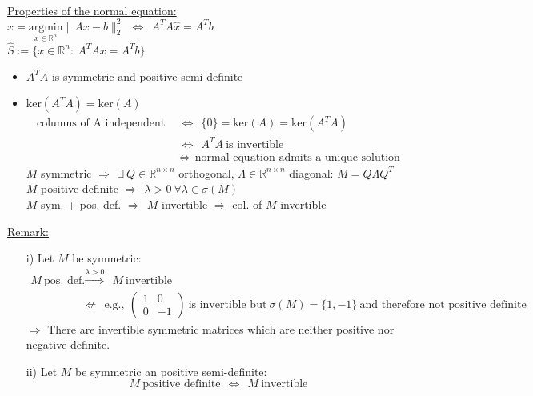 \begin{frame}
	~\\
	{\blank
	\underline{Properties of the normal equation:}\\
	$\widehat{x}=\underset{x\in\mathbb{R}^n}{\mathrm{argmin}}\|Ax-b\|_2^2~~\Leftrightarrow~~A^TA\widehat{x}=A^Tb$\\
	$\widehat{S}:=\{x\in\mathbb{R}^n:~A^TAx=A^Tb\}$
	\begin{itemize}\blank
		\item 
		$A^TA$ is symmetric and positive semi-definite
		\item
		$\text{ker}(A^TA)=\text{ker}(A)$
		\begin{align*}
		\text{columns of A independent}~~&\Leftrightarrow~~\{0\}=\text{ker}(A)=\text{ker}(A^TA)\\
		&\Leftrightarrow~~A^TA~\text{is invertible}\\
		&\Leftrightarrow~~\text{normal equation admits a unique solution}
		\end{align*}
		$M$ symmetric $\Rightarrow~~\exists~Q\in\mathbb{R}^{n\times n}$ orthogonal, $\Lambda\in\mathbb{R}^{n\times n}$ diagonal: $M=Q\Lambda Q^T$\\
		$M$ positive definite $\Rightarrow~~\lambda >0~\forall\lambda\in\sigma(M)$\\
		$M$ sym. + pos. def. $\Rightarrow~~M$ invertible $\Rightarrow$ col. of $M$ invertible
	\end{itemize}
\underline{Remark:}
\begin{itemize}\blank
	\item [i)]
	Let $M$ be symmetric:
	\begin{align*}
	M~\text{pos. def.}~~&\stackrel{\lambda>0}{\Rightarrow}~~M~\text{invertible}\\
	&\nLeftarrow~~\text{e.g.},~\begin{pmatrix}1&0\\0&-1\end{pmatrix}~\text{is invertible but}~\sigma(M)=\{1,-1\}~\text{and therefore not positive definite}
	\end{align*}
	$\Rightarrow$ There are invertible symmetric matrices which are neither positive nor negative definite.
	\item [ii)]
	Let $M$ be symmetric an positive semi-definite:
	$$
	M~\text{positive definite}~~\Leftrightarrow~~M~\text{invertible}
	$$
\end{itemize}
}
\end{frame}

